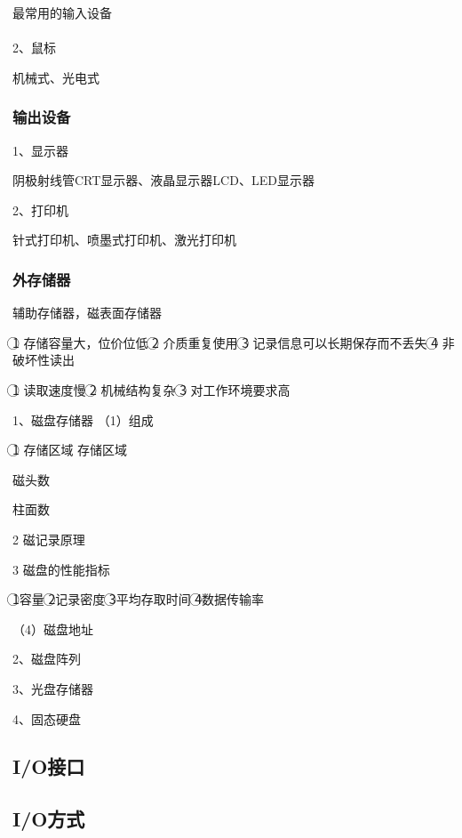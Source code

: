\documentclass{ctexart}
\begin{document}
最常用的输入设备
\\\\

2、鼠标

机械式、光电式


\subsubsection{输出设备}

1、显示器

阴极射线管CRT显示器、液晶显示器LCD、LED显示器


2、打印机

针式打印机、喷墨式打印机、激光打印机

\subsubsection{外存储器}

辅助存储器，磁表面存储器

\textcircled{1} 存储容量大，位价位低
\textcircled{2} 介质重复使用
\textcircled{3} 记录信息可以长期保存而不丢失
\textcircled{4} 非破坏性读出

\textcircled{1} 读取速度慢
\textcircled{2} 机械结构复杂
\textcircled{3} 对工作环境要求高

1、磁盘存储器
（1）组成

\textcircled{1} 存储区域
存储区域

磁头数

柱面数

{2} 磁记录原理

{3 }磁盘的性能指标

\textcircled{1}容量
\textcircled{2}记录密度
\textcircled{3}平均存取时间
\textcircled{4}数据传输率

（4）磁盘地址

2、磁盘阵列

3、光盘存储器

4、固态硬盘

\subsection{I/O接口}

\subsection{I/O方式}
\end{document}
